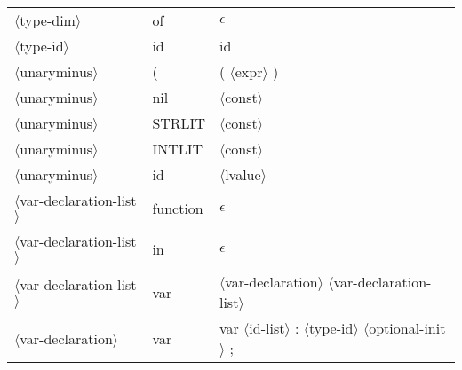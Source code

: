 \documentclass[11pt, fleqn]{article}
\newcommand{\atag}[1]{$\langle$#1$\rangle$}
\begin{document}
\begin{longtable}{l|l|l}
\atag{type-dim}					&	of	&	$\epsilon$	\\
\atag{type-id}					&	id		&	id	\\
\atag{unaryminus}				&	(		&	( \atag{expr} )	\\
\atag{unaryminus}				&	nil		&	\atag{const}	\\
\atag{unaryminus}				&	STRLIT		&	\atag{const}	\\
\atag{unaryminus}				&	INTLIT		&	\atag{const}	\\
\atag{unaryminus}				&	id		&	\atag{lvalue}		\\
\atag{var-declaration-list}		&	function		&	$\epsilon$	\\
\atag{var-declaration-list}		&	in	&		$\epsilon$		\\
\atag{var-declaration-list}		&	var		& 	\atag{var-declaration} \atag{var-declaration-list}		\\
\atag{var-declaration}			&	var 		&	var \atag{id-list} : \atag{type-id} \atag{optional-init} ;	\\
\end{longtable}
\end{document}
